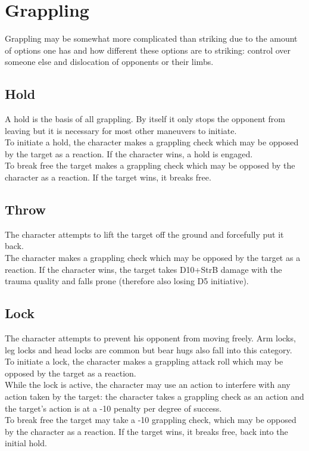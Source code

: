 \documentclass[12pt,a4paper,openany]{book}
\begin{document}
	\section{Grappling}
	Grappling may be somewhat more complicated than striking due to the amount of options one has and how different these options are to striking: control over someone else and dislocation of opponents or their limbs.
	\subsection*{Hold}
	A hold is the basis of all grappling. By itself it only stops the opponent from leaving but it is necessary for most other maneuvers to initiate.\\
	To initiate a hold, the character makes a grappling check which may be opposed by the target as a reaction. If the character wins, a hold is engaged.\\
	To break free the target makes a grappling check which may be opposed by the character as a reaction. If the target wins, it breaks free.
	\subsection*{Throw}
	The character attempts to lift the target off the ground and forcefully put it back.\\
	The character makes a grappling check which may be opposed by the target as a reaction. If the character wins, the target takes D10+StrB damage with the trauma quality and falls prone (therefore also losing D5 initiative).
	\subsection*{Lock}
	The character attempts to prevent his opponent from moving freely. Arm locks, leg locks and head locks are common but bear hugs also fall into this category.\\
	To initiate a lock, the character makes a grappling attack roll which may be opposed by the target as a reaction.\\
	While the lock is active, the character may use an action to interfere with any action taken by the target: the character takes a grappling check as an action and the target’s action is at a -10 penalty per degree of success.\\
	To break free the target may take a -10 grappling check, which may be opposed by the character as a reaction. If the target wins, it breaks free, back into the initial hold.
\end{document}

